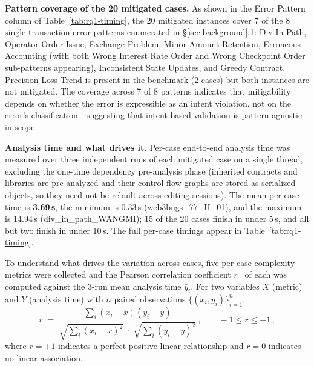 \documentclass[pdflatex,sn-basic]{sn-jnl}%
\theoremstyle{thmstyleone}%
\theoremstyle{thmstyletwo}%
\theoremstyle{thmstylethree}%
\begin{document}
\smallskip
\noindent\textbf{Pattern coverage of the 20 mitigated cases.}
As shown in the Error Pattern column of Table~\ref{tab:rq1-timing}, the 20 mitigated instances cover 7 of the 8 single-transaction error patterns enumerated in §\ref{sec:background}.1: Div In Path, Operator Order Issue, Exchange Problem, Minor Amount Retention, Erroneous Accounting (with both Wrong Interest Rate Order and Wrong Checkpoint Order sub-patterns appearing), Inconsistent State Updates, and Greedy Contract.
Precision Loss Trend is present in the benchmark (2 cases) but both instances are not mitigated.
The coverage across 7 of 8 patterns indicates that mitigability depends on whether the error is expressible as an intent violation, not on the error's classification---suggesting that intent-based validation is pattern-agnostic in scope.

\smallskip
\noindent\textbf{Analysis time and what drives it.}
Per-case end-to-end analysis time was measured over three independent runs of each mitigated case on a single thread, excluding the one-time dependency pre-analysis phase (inherited contracts and libraries are pre-analyzed and their control-flow graphs are stored as serialized objects, so they need not be rebuilt across editing sessions).
The mean per-case time is \textbf{3.69\,s}, the minimum is 0.33\,s (web3bugs\_77\_H\_01), and the maximum is 14.94\,s (div\_in\_path\_WANGMI); 15 of the 20 cases finish in under 5\,s, and all but two finish in under 10\,s.
The full per-case timings appear in Table~\ref{tab:rq1-timing}.

To understand what drives the variation across cases, five per-case complexity metrics were collected and the Pearson correlation coefficient $r$~\citep{pearson_r} of each was computed against the 3-run mean analysis time $\bar{y}_i$.
For two variables $X$ (metric) and $Y$ (analysis time) with $n$ paired observations $\{(x_i,y_i)\}_{i=1}^{n}$,
\[
  r \;=\; \frac{\sum_{i}(x_i-\bar{x})(y_i-\bar{y})}
               {\sqrt{\sum_{i}(x_i-\bar{x})^{2}}\;\cdot\;\sqrt{\sum_{i}(y_i-\bar{y})^{2}}}\,,
  \qquad -1 \le r \le +1\,,
\]
where $r=+1$ indicates a perfect positive linear relationship and $r=0$ indicates no linear association.
\end{document}
